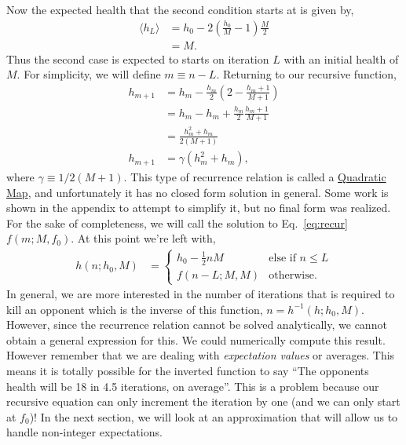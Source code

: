 \documentclass[../../main.tex]{subfiles}
\begin{document}
			Now the expected health that the second condition starts at is given by,
			\begin{align}
				\langle h_L \rangle &= h_0 - 2\left(\frac{h_0}{M} - 1\right) \frac{M}{2}\\
				&= M.
			\end{align}
			Thus the second case is expected to starts on iteration $L$ with an initial health of $M$. For simplicity, we will define $m\equiv n-L$. Returning to our recursive function,
			\begin{align}
				h_{m+1} &= h_{m} - \frac{h_m}{2}\left(2 - \frac{h_m + 1}{M+1}\right) \\
				&= h_{m} - h_m + \frac{h_m}{2}\frac{h_m + 1}{M+1} \\
				&= \frac{h_m^2 + h_m}{2(M+1)} \\
				h_{m+1} &= \gamma (h_m^2 + h_m), \label{eq:recur}
			\end{align}
			where $\gamma\equiv1 / 2(M+1)$. This type of recurrence relation is called a \href{http://mathworld.wolfram.com/QuadraticMap.html}{Quadratic Map}, and unfortunately it has no closed form solution in general. Some work is shown in the appendix to attempt to simplify it, but no final form was realized. For the sake of completeness, we will call the solution to Eq.~\ref{eq:recur} $f(m; M, f_0)$. At this point we're left with,
			\begin{align}
					h(n; h_0, M) &=  \begin{cases}
					h_0 - \frac{1}{2}nM &\text{else if $n \le L$} \\
					f(n - L; M, M) &\text{otherwise}.
				\end{cases}
			\end{align}
			In general, we are more interested in the number of iterations that is required to kill an opponent which is the inverse of this function, $n=h^{-1}(h; h_0, M)$. However, since the recurrence relation cannot be solved analytically, we cannot obtain a general expression for this. We could numerically compute this result. However remember that we are dealing with \emph{expectation values} or averages. This means it is totally possible for the inverted function to say ``The opponents health will be 18 in 4.5 iterations, on average''. This is a problem because our recursive equation can only increment the iteration by one (and we can only start at $f_0$)! In the next section, we will look at an approximation that will allow us to handle non-integer expectations.
\end{document}
